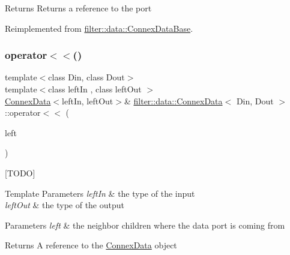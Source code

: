\begin{DoxyReturn}{Returns}
Returns a reference to the port 
\end{DoxyReturn}


Reimplemented from \hyperlink{classfilter_1_1data_1_1_connex_data_base_a3cf1336815c061bc721f6b352900e6f4}{filter\+::data\+::\+Connex\+Data\+Base}.

\mbox{\label{classfilter_1_1data_1_1_connex_data_af7a3a297477db6925728016cb9c8961a}} 
\subsubsection{\texorpdfstring{operator$<$$<$()}{operator<<()}\hspace{0.1cm}{\footnotesize\ttfamily [1/2]}}
{\footnotesize\ttfamily template$<$class Din, class Dout$>$ \\
template$<$class left\+In , class left\+Out $>$ \\
\hyperlink{classfilter_1_1data_1_1_connex_data}{Connex\+Data}$<$left\+In, left\+Out$>$\& \hyperlink{classfilter_1_1data_1_1_connex_data}{filter\+::data\+::\+Connex\+Data}$<$ Din, Dout $>$\+::operator$<$$<$ (\begin{DoxyParamCaption}\item[{\hyperlink{classfilter_1_1data_1_1_connex_data}{Connex\+Data}$<$ left\+In, left\+Out $>$ \&}]{left }\end{DoxyParamCaption})\hspace{0.3cm}{\ttfamily [inline]}}

\mbox{[}T\+O\+DO\mbox{]} 
\begin{DoxyTemplParams}{Template Parameters}
{\em left\+In} & the type of the input \\
\hline
{\em left\+Out} & the type of the output \\
\hline
\end{DoxyTemplParams}

\begin{DoxyParams}{Parameters}
{\em left} & the neighbor children where the data port is coming from \\
\hline
\end{DoxyParams}
\begin{DoxyReturn}{Returns}
A reference to the \hyperlink{classfilter_1_1data_1_1_connex_data}{Connex\+Data} object 
\end{DoxyReturn}
\mbox{\label{classfilter_1_1data_1_1_connex_data_a4a4ad046f5772283f520189e62327376}} 
